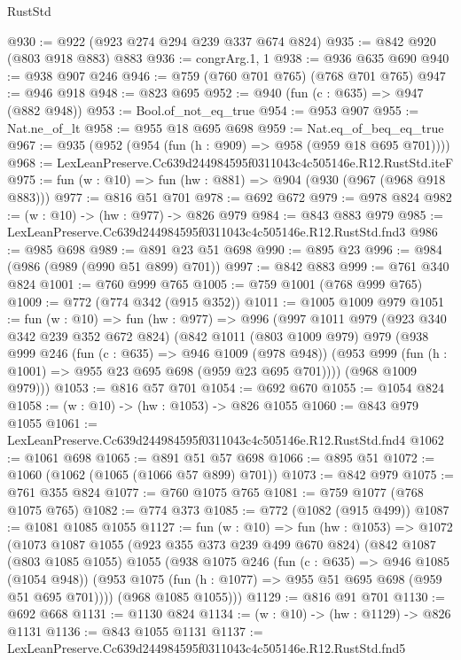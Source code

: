 \begin{lexlean}{RustStd}
\begin{coremodule}
@930 := @922 (@923 @274 @294 @239 @337 @674 @824)
@935 := @842 @920 (@803 @918 @883) @883
@936 := congrArg.{1, 1}
@938 := @936 @635 @690
@940 := @938 @907 @246
@946 := @759 (@760 @701 @765) (@768 @701 @765)
@947 := @946 @918
@948 := @823 @695
@952 := @940 (fun (c : @635) => @947 (@882 @948))
@953 := Bool.of_not_eq_true
@954 := @953 @907
@955 := Nat.ne_of_lt
@958 := @955 @18 @695 @698
@959 := Nat.eq_of_beq_eq_true
@967 := @935 (@952 (@954 (fun (h : @909) => @958 (@959 @18 @695 @701))))
@968 := LexLeanPreserve.Cc639d244984595f0311043c4c505146e.R12.RustStd.iteF
@975 := fun (w : @10) => fun (hw : @881) => @904 (@930 (@967 (@968 @918 @883)))
@977 := @816 @51 @701
@978 := @692 @672
@979 := @978 @824
@982 := (w : @10) -> (hw : @977) -> @826 @979
@984 := @843 @883 @979
@985 := LexLeanPreserve.Cc639d244984595f0311043c4c505146e.R12.RustStd.fnd3
@986 := @985 @698
@989 := @891 @23 @51 @698
@990 := @895 @23
@996 := @984 (@986 (@989 (@990 @51 @899) @701))
@997 := @842 @883
@999 := @761 @340 @824
@1001 := @760 @999 @765
@1005 := @759 @1001 (@768 @999 @765)
@1009 := @772 (@774 @342 (@915 @352))
@1011 := @1005 @1009 @979
@1051 := fun (w : @10) =>
  fun (hw : @977) =>
  @996
    (@997
      @1011
      @979
      (@923 @340 @342 @239 @352 @672 @824)
      (@842
        @1011
        (@803 @1009 @979)
        @979
        (@938
          @999
          @246
          (fun (c : @635) => @946 @1009 (@978 @948))
          (@953 @999 (fun (h : @1001) => @955 @23 @695 @698 (@959 @23 @695 @701))))
        (@968 @1009 @979)))
@1053 := @816 @57 @701
@1054 := @692 @670
@1055 := @1054 @824
@1058 := (w : @10) -> (hw : @1053) -> @826 @1055
@1060 := @843 @979 @1055
@1061 := LexLeanPreserve.Cc639d244984595f0311043c4c505146e.R12.RustStd.fnd4
@1062 := @1061 @698
@1065 := @891 @51 @57 @698
@1066 := @895 @51
@1072 := @1060 (@1062 (@1065 (@1066 @57 @899) @701))
@1073 := @842 @979
@1075 := @761 @355 @824
@1077 := @760 @1075 @765
@1081 := @759 @1077 (@768 @1075 @765)
@1082 := @774 @373
@1085 := @772 (@1082 (@915 @499))
@1087 := @1081 @1085 @1055
@1127 := fun (w : @10) =>
  fun (hw : @1053) =>
  @1072
    (@1073
      @1087
      @1055
      (@923 @355 @373 @239 @499 @670 @824)
      (@842
        @1087
        (@803 @1085 @1055)
        @1055
        (@938
          @1075
          @246
          (fun (c : @635) => @946 @1085 (@1054 @948))
          (@953 @1075 (fun (h : @1077) => @955 @51 @695 @698 (@959 @51 @695 @701))))
        (@968 @1085 @1055)))
@1129 := @816 @91 @701
@1130 := @692 @668
@1131 := @1130 @824
@1134 := (w : @10) -> (hw : @1129) -> @826 @1131
@1136 := @843 @1055 @1131
@1137 := LexLeanPreserve.Cc639d244984595f0311043c4c505146e.R12.RustStd.fnd5

\end{coremodule}
\end{lexlean}
